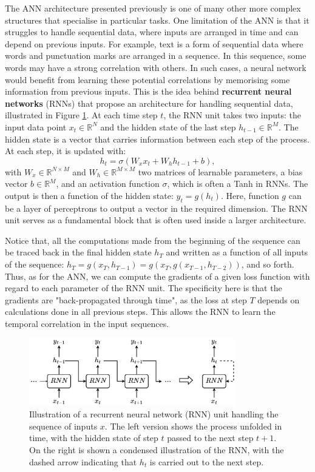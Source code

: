 The ANN architecture presented previously is one of many other more complex structures that specialise in particular tasks. One limitation of the ANN is that it struggles to handle sequential data, where inputs are arranged in time and can depend on previous inputs. For example, text is a form of sequential data where words and punctuation marks are arranged in a sequence. In this sequence, some words may have a strong correlation with others. In such cases, a neural network would benefit from learning these potential correlations by memorising some information from previous inputs. This is the idea behind \textbf{recurrent neural networks} (RNNs) that propose an architecture for handling sequential data, illustrated in Figure \ref{fig:rnn}. At each time step $t$, the RNN unit takes two inputs: the input data point $x_t\in\mathbb{R}^N$ and the hidden state of the last step $h_{t-1}\in\mathbb{R}^M$. The hidden state is a vector that carries information between each step of the process. At each step, it is updated with:
\begin{equation}
    h_t=\sigma\left(W_xx_t+W_hh_{t-1}+b\right),
\end{equation}
with $W_x\in\mathbb{R}^{N\times M}$ and $W_h\in\mathbb{R}^{M\times M}$ two matrices of learnable parameters, a bias vector $b\in\mathbb{R}^M$, and an activation function $\sigma$, which is often a Tanh in RNNs. The output is then a function of the hidden state: $y_t=g(h_t)$. Here, function $g$ can be a layer of perceptrons to output a vector in the required dimension. The RNN unit serves as a fundamental block that is often used inside a larger architecture. 

Notice that, all the computations made from the beginning of the sequence can be traced back in the final hidden state $h_T$ and written as a function of all inputs of the sequence: $h_T=g(x_T,h_{T-1})=g(x_T,g(x_{T-1},h_{T-2}))$, and so forth. Thus, as for the ANN, we can compute the gradients of a given loss function with regard to each parameter of the RNN unit. The specificity here is that the gradients are "back-propagated through time", as the loss at step $T$ depends on calculations done in all previous steps. This allows the RNN to learn the temporal correlation in the input sequences.

\begin{figure}
    \centering
    \includegraphics[width=0.8\textwidth]{Figures/RL/rnn.png}
    \caption{Illustration of a recurrent neural network (RNN) unit handling the sequence of inputs $x$. The left version shows the process unfolded in time, with the hidden state of step $t$ passed to the next step $t+1$. On the right is shown a condensed illustration of the RNN, with the dashed arrow indicating that $h_t$ is carried out to the next step.}
    \label{fig:rnn}
\end{figure}

